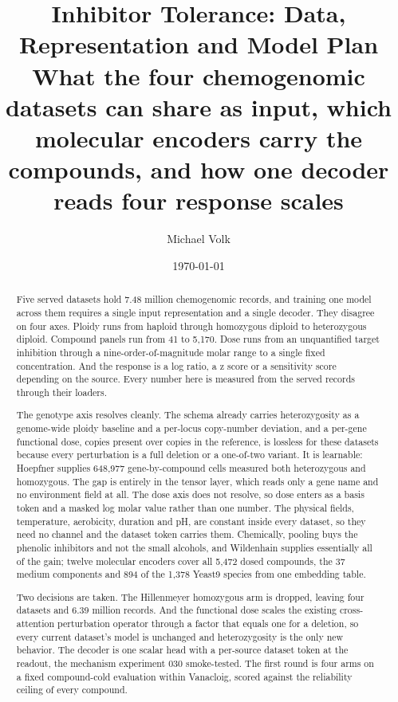 \documentclass[10pt,a4paper]{article}
\title{\vspace{-1.5em}Inhibitor Tolerance: Data, Representation and Model Plan\\
  {\large What the four chemogenomic datasets can share as input, which molecular encoders
   carry the compounds, and how one decoder reads four response scales}}
\author{Michael Volk}
\date{\today}
\begin{document}
\maketitle
\thispagestyle{empty}

\begin{abstract}
\noindent
Five served datasets hold 7.48 million chemogenomic records, and training one model across
them requires a single input representation and a single decoder. They disagree on four axes.
Ploidy runs from haploid through homozygous diploid to heterozygous diploid. Compound panels
run from 41 to 5{,}170. Dose runs from an unquantified target inhibition through a
nine-order-of-magnitude molar range to a single fixed concentration. And the response is a
log ratio, a z score or a sensitivity score depending on the source. Every number here is
measured from the served records through their loaders.

The genotype axis resolves cleanly. The schema already carries heterozygosity as a
genome-wide ploidy baseline and a per-locus copy-number deviation, and a per-gene functional
dose, copies present over copies in the reference, is lossless for these datasets because
every perturbation is a full deletion or a one-of-two variant. It is learnable: Hoepfner
supplies 648{,}977 gene-by-compound cells measured both heterozygous and homozygous. The gap
is entirely in the tensor layer, which reads only a gene name and no environment field at
all. The dose axis does not resolve, so dose enters as a basis token and a masked log molar
value rather than one number. The physical fields, temperature, aerobicity, duration and pH,
are constant inside every dataset, so they need no channel and the dataset token carries
them. Chemically, pooling buys the phenolic inhibitors and not the small alcohols, and
Wildenhain supplies essentially all of the gain; twelve molecular encoders cover all 5{,}472
dosed compounds, the 37 medium components and 894 of the 1{,}378 Yeast9 species from one
embedding table.

Two decisions are taken. The Hillenmeyer homozygous arm is dropped, leaving four datasets and
6.39 million records. And the functional dose scales the existing cross-attention
perturbation operator through a factor that equals one for a deletion, so every current
dataset's model is unchanged and heterozygosity is the only new behavior. The decoder is one
scalar head with a per-source dataset token at the readout, the mechanism experiment 030
smoke-tested. The first round is four arms on a fixed compound-cold evaluation within
Vanacloig, scored against the reliability ceiling of every compound.
\end{abstract}

\vspace{0.5em}
\tccontents
\clearpage













\end{document}
